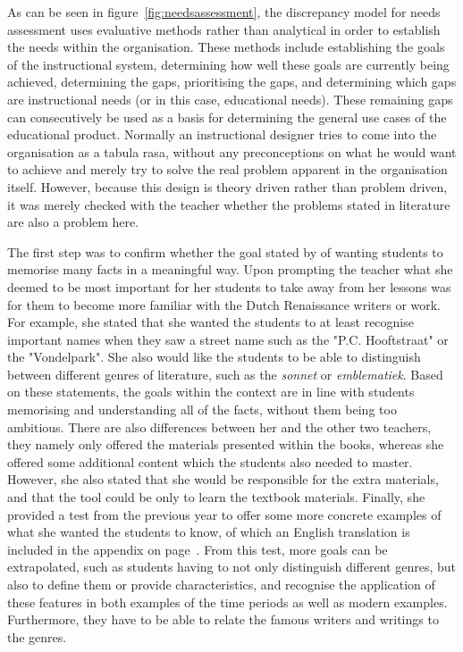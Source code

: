 As can be seen in figure~\ref{fig:needsassessment}, the discrepancy model for needs assessment uses evaluative methods rather than analytical in order to establish the needs within the organisation. These methods include establishing the goals of the instructional system, determining how well these goals are currently being achieved, determining the gaps, prioritising the gaps, and determining which gaps are instructional needs (or in this case, educational needs). These remaining gaps can consecutively be used as a basis for determining the general use cases of the educational product. Normally an instructional designer tries to come into the organisation as a tabula rasa, without any preconceptions on what he would want to achieve and merely try to solve the real problem apparent in the organisation itself. However, because this design is theory driven rather than problem driven, it was merely checked with the teacher whether the problems stated in literature are also a problem here.

The first step was to confirm whether the goal stated by  of wanting students to memorise many facts in a meaningful way. Upon prompting the teacher what she deemed to be most important for her students to take away from her lessons was for them to become more familiar with the Dutch Renaissance writers or work. For example, she stated that she wanted the students to at least recognise important names when they saw a street name such as the "P.C. Hooftstraat" or the "Vondelpark". She also would like the students to be able to distinguish between different genres of literature, such as the \emph{sonnet} or \emph{emblematiek}. Based on these statements, the goals within the context are in line with students memorising and understanding all of the facts, without them being too ambitious. There are also differences between her and the other two teachers, they namely only offered the materials presented within the books, whereas she offered some additional content which the students also needed to master. However, she also stated that she would be responsible for the extra materials, and that the tool could be only to learn the textbook materials. Finally, she provided a test from the previous year to offer some more concrete examples of what she wanted the students to know, of which an English translation is included in the appendix on page~\pageref{ch:exampletest}. From this test, more goals can be extrapolated, such as students having to not only distinguish different genres, but also to define them or provide characteristics, and recognise the application of these features in both examples of the time periods as well as modern examples. Furthermore, they have to be able to relate the famous writers and writings to the genres.


